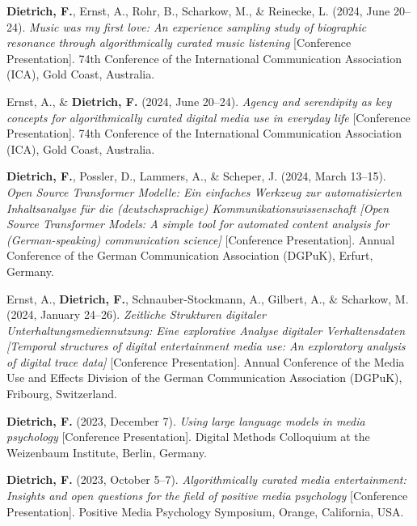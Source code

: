 \documentclass[11pt,a4paper,]{awesome-cv}
\newlength{\cslhangindent}
\newenvironment{CSLReferences}[2] %
 {\begin{list}{}{%
  \setlength{\itemindent}{0pt}
  \setlength{\leftmargin}{0pt}
  \setlength{\parsep}{0pt}
  \ifodd #1
   \setlength{\leftmargin}{\cslhangindent}
   \setlength{\itemindent}{-1\cslhangindent}
  \fi
  \setlength{\itemsep}{#2\baselineskip}}}
 {\end{list}}
\begin{document}
\label{refs-74ae8ba0f22a5f51e2ca50112517cc89}
\begin{CSLReferences}{1}{0}
\textbf{Dietrich, F.}, Ernst, A., Rohr, B., Scharkow, M., \& Reinecke,
L. (2024, June 20--24). \emph{Music was my first love: An experience
sampling study of biographic resonance through algorithmically curated
music listening} {[}Conference Presentation{]}. 74th Conference of the
International Communication Association (ICA), Gold Coast, Australia.

Ernst, A., \& \textbf{Dietrich, F.} (2024, June 20--24). \emph{Agency
and serendipity as key concepts for algorithmically curated digital
media use in everyday life} {[}Conference Presentation{]}. 74th
Conference of the International Communication Association (ICA), Gold
Coast, Australia.

\textbf{Dietrich, F.}, Possler, D., Lammers, A., \& Scheper, J. (2024,
March 13--15). \emph{Open Source Transformer Modelle: Ein einfaches
Werkzeug zur automatisierten Inhaltsanalyse für die (deutschsprachige)
Kommunikationswissenschaft {[}Open Source Transformer Models: A simple
tool for automated content analysis for (German-speaking) communication
science{]}} {[}Conference Presentation{]}. Annual Conference of the
German Communication Association (DGPuK), Erfurt, Germany.

Ernst, A., \textbf{Dietrich, F.}, Schnauber-Stockmann, A., Gilbert, A.,
\& Scharkow, M. (2024, January 24--26). \emph{Zeitliche Strukturen
digitaler Unterhaltungsmediennutzung: Eine explorative Analyse digitaler
Verhaltensdaten {[}Temporal structures of digital entertainment media
use: An exploratory analysis of digital trace data{]}} {[}Conference
Presentation{]}. Annual Conference of the Media Use and Effects Division
of the German Communication Association (DGPuK), Fribourg, Switzerland.

\textbf{Dietrich, F.} (2023, December 7). \emph{Using large language
models in media psychology} {[}Conference Presentation{]}. Digital
Methods Colloquium at the Weizenbaum Institute, Berlin, Germany.

\textbf{Dietrich, F.} (2023, October 5--7). \emph{Algorithmically
curated media entertainment: Insights and open questions for the field
of positive media psychology} {[}Conference Presentation{]}. Positive
Media Psychology Symposium, Orange, California, USA.


\end{CSLReferences}
\end{document}
